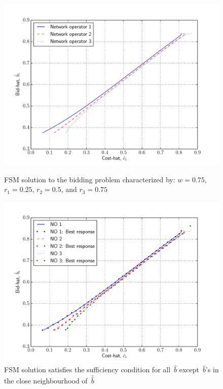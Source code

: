 \begin{figure}[p!]
  \includegraphics[width=\figsize]{Indirect/Figures/forward_shooting_3}
  \caption{FSM solution to the bidding problem characterized by: $w=0.75$, $r_1 = 0.25$, $r_2 = 0.5$, and $r_3 = 0.75$}
  \label{fig:forward_shooting_3_indirect}
  \vspace{10mm}
  \includegraphics[width=\figsize]{Indirect/Figures/forward_shooting_3_sufficiency}
  \caption{FSM solution satisfies the sufficiency condition for all~$\hat{b}$ except~$\hat{b}$'s in the close neighbourhood of~$\bar{\hat{b}}$}
  \label{fig:forward_shooting_3_sufficiency_indirect}
\end{figure}

